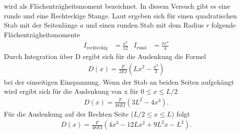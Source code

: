 wird als Flächenträgheitsmoment bezeichnet.
In diesem Versuch gibt es eine runde und eine Rechteckige Stange.
Laut \cite{uni_siegen} ergeben sich für einen quadratischen Stab mit der Seitenlänge $a$ und einen runden Stab mit dem Radius $r$ folgende Flächenträgheitsmomente
\begin{align}
    I_\text{rechteckig} &= \frac{a^4}{12} & I_\text{rund} &= \frac{\pi r^4}{4}
    \label{eq:Flachentragheitsmomente}
\end{align}
%
Durch Integration über D ergibt sich für die Auslenkung die Formel
\begin{align}
    D(x) = \frac{F}{2 E I} \left(L x^2 - \frac{x^3}{3} \right)
    \label{eq:D_x_einseitig}
\end{align}
bei der einseitigen Einspannung.
Wenn der Stab an beiden Seiten aufgehängt wird ergibt sich für die Auslenkung von x für
$0 \leq x \leq L/2$
\begin{align}
    D(x) = \frac{F}{48 E I} \left(3 L^2- 4 x^3\right).
    \label{D_x_links}
\end{align}
Für die Auslenkung auf der Rechten Seite ($L/2 \leq x \leq L $) folgt
\begin{align}
    D(x) = \frac{F}{48 E I} \left(4x^3 - 12L x^2 + 9L^2 x - L^3 \right). 
    \label{eq:D_x_beidseitig_links}
\end{align}